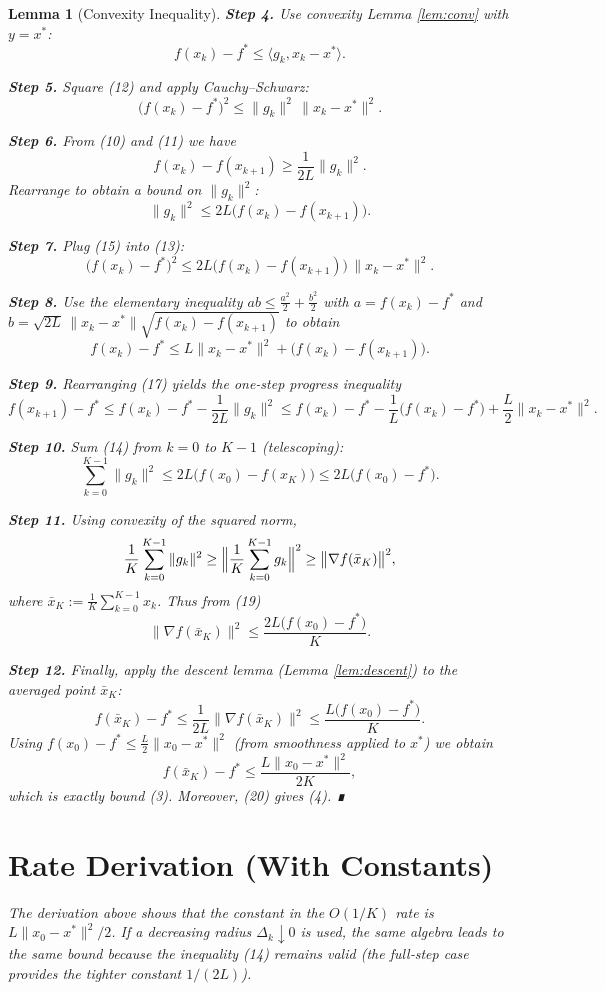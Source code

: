 \documentclass{article}
\newtheorem{lemma}{Lemma}
\begin{document}
\begin{lemma}[Convexity Inequality]
\noindent\textbf{Step 4.}  Use convexity Lemma \ref{lem:conv} with $y=x^{*}$:
\[
f(x_k)-f^{*}\le \langle g_k, x_k-x^{*}\rangle .
\tag{12}
\]

\noindent\textbf{Step 5.}  Square (12) and apply Cauchy–Schwarz:
\[
\bigl(f(x_k)-f^{*}\bigr)^{2}\le \|g_k\|^{2}\,\|x_k-x^{*}\|^{2}.
\tag{13}
\]

\noindent\textbf{Step 6.}  From (10) and (11) we have
\[
f(x_k)-f(x_{k+1})\ge \frac{1}{2L}\|g_k\|^{2}.
\tag{14}
\]
Rearrange to obtain a bound on $\|g_k\|^{2}$:
\[
\|g_k\|^{2}\le 2L\bigl(f(x_k)-f(x_{k+1})\bigr).
\tag{15}
\]

\noindent\textbf{Step 7.}  Plug (15) into (13):
\[
\bigl(f(x_k)-f^{*}\bigr)^{2}\le 2L\bigl(f(x_k)-f(x_{k+1})\bigr)\,\|x_k-x^{*}\|^{2}.
\tag{16}
\]

\noindent\textbf{Step 8.}  Use the elementary inequality $ab\le \frac{a^{2}}{2}+ \frac{b^{2}}{2}$ with
$a=f(x_k)-f^{*}$ and $b=\sqrt{2L}\,\|x_k-x^{*}\|\sqrt{f(x_k)-f(x_{k+1})}$ to obtain
\[
f(x_k)-f^{*}\le L\|x_k-x^{*}\|^{2}+ \bigl(f(x_k)-f(x_{k+1})\bigr).
\tag{17}
\]

\noindent\textbf{Step 9.}  Rearranging (17) yields the one‑step progress inequality
\[
f(x_{k+1})-f^{*}\le f(x_k)-f^{*}-\frac{1}{2L}\|g_k\|^{2}
\le f(x_k)-f^{*}-\frac{1}{L}\bigl(f(x_k)-f^{*}\bigr)+\frac{L}{2}\|x_k-x^{*}\|^{2}.
\tag{18}
\]

\noindent\textbf{Step 10.}  Sum (14) from $k=0$ to $K-1$ (telescoping):
\[
\sum_{k=0}^{K-1}\|g_k\|^{2}\le 2L\bigl(f(x_0)-f(x_K)\bigr)
\le 2L\bigl(f(x_0)-f^{*}\bigr).
\tag{19}
\]

\noindent\textbf{Step 11.}  Using convexity of the squared norm,
\[
\frac{1}{K}\sum_{k=0}^{K-1}\|g_k\|^{2}\ge
\Bigl\|\frac{1}{K}\sum_{k=0}^{K-1}g_k\Bigr\|^{2}
\ge \bigl\|\nabla f(\bar x_K)\bigr\|^{2},
\]
where $\bar x_K:=\frac{1}{K}\sum_{k=0}^{K-1}x_k$.
Thus from (19)
\[
\bigl\|\nabla f(\bar x_K)\bigr\|^{2}\le\frac{2L\bigl(f(x_0)-f^{*}\bigr)}{K}.
\tag{20}
\]

\noindent\textbf{Step 12.}  Finally, apply the descent lemma (Lemma \ref{lem:descent}) to the averaged point $\bar x_K$:
\[
f(\bar x_K)-f^{*}\le \frac{1}{2L}\bigl\|\nabla f(\bar x_K)\bigr\|^{2}
\le \frac{L\bigl(f(x_0)-f^{*}\bigr)}{K}.
\tag{21}
\]
Using $f(x_0)-f^{*}\le \frac{L}{2}\|x_0-x^{*}\|^{2}$ (from smoothness applied to $x^{*}$) we obtain
\[
f(\bar x_K)-f^{*}\le\frac{L\|x_0-x^{*}\|^{2}}{2K},
\]
which is exactly bound (3).  Moreover, (20) gives (4).  ∎

\section*{Rate Derivation (With Constants)}
The derivation above shows that the constant in the $O(1/K)$ rate is $L\|x_0-x^{*}\|^{2}/2$.  If a decreasing radius $\Delta_k\downarrow0$ is used, the same algebra leads to the same bound because the inequality (14) remains valid (the full‑step case provides the tighter constant $1/(2L)$).


\end{lemma}
\end{document}
